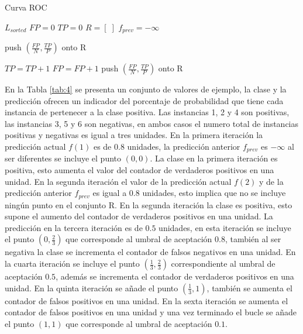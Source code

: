\bigbreak

\begin{algorithm}
    \caption{Curva ROC}
        \begin{algorithmic}[1]
            \State $L_{sorted}$
            \State $FP = 0$
            \State $TP = 0$
            \State $R = [\phantom{.}]$
            \State $f_{prev} = - \infty$

                    \State  push $(\frac{FP}{N}, \frac{TP}{P})$ onto R
                \EndIf

                    \State  $TP = TP + 1$
                    \State  $FP = FP + 1$
                \EndIf
            \EndFor
            \State  push $(\frac{FP}{N}, \frac{TP}{P})$ onto R
    \end{algorithmic}
    \label{al:roc}
\end{algorithm}

\bigbreak

En la Tabla \ref{tab:4} se presenta un conjunto de valores de ejemplo, la clase y la predicción ofrecen un indicador del porcentaje de probabilidad que tiene cada instancia de pertenecer a la clase positiva. Las instancias 1, 2 y 4 son positivas, las instancias 3, 5 y 6 son negativas, en ambos casos el numero total de instancias positivas y negativas es igual a tres unidades. En la primera iteración la predicción actual $f(1)$ es de $0.8$ unidades, la predicción anterior $f_{prev}$ es $- \infty$ al ser diferentes se incluye el punto $(0, 0)$. La clase en la primera iteración es positiva, esto aumenta el valor del contador de verdaderos positivos en una unidad. En la segunda iteración el valor de la predicción actual $f(2)$ y de la predicción anterior $f_{prev}$ es igual a $0.8$ unidades, esto implica que no se incluye ningún punto en el conjunto R. En la segunda iteración la clase es positiva, esto supone el aumento del contador de verdaderos positivos en una unidad. La predicción en la tercera iteración es de $0.5$ unidades, en esta iteración se incluye el punto $(0, \frac{2}{3})$ que corresponde al umbral de aceptación $0.8$, también al ser negativa la clase se incrementa el contador de falsos negativos en una unidad. En la cuarta iteración se incluye el punto $(\frac{1}{3}, \frac{2}{3})$ correspondiente al umbral de aceptación $0.5$, además se incrementa el contador de verdaderos positivos en una unidad. En la quinta iteración se añade el punto $(\frac{1}{3}, 1)$, también se aumenta el contador de falsos positivos en una unidad. En la sexta iteración se aumenta el contador de falsos positivos en una unidad y una vez terminado el bucle se añade el punto $(1, 1)$ que corresponde al umbral de aceptación $0.1$.

